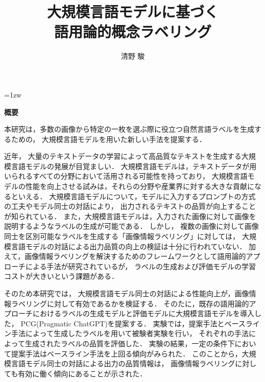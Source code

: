 \documentclass[a4paper,11pt]{jreport}
\title{大規模言語モデルに基づく\\語用論的概念ラベリング}
\author{清野 駿}
\begin{document}
\maketitle
\thispagestyle{empty}
\newpage

\thispagestyle{empty}
\vspace*{20pt plus 1fil}
\parindent=1zw
\noindent
\begin{center}
{\bf 概要}
\vspace{5mm}
\end{center}
本研究は，多数の画像から特定の一枚を選ぶ際に役立つ自然言語ラベルを生成するための，
大規模言語モデルを用いた新しい手法を提案する．

近年，
大量のテキストデータの学習によって高品質なテキストを生成する大規模言語モデルの発展が目覚ましい．
大規模言語モデルは，テキストデータが用いられるすべての分野において活用される可能性を持っており，
大規模言語モデルの性能を向上させる試みは，それらの分野や産業界に対する大きな貢献になるといえる．
大規模言語モデルについて，モデルに入力するプロンプトの方式の工夫やモデル同士の対話により，
出力されるテキストの品質が向上することが知られている．
また，大規模言語モデルは，入力された画像に対して画像を説明するようなラベルの生成が可能である．
しかし，
複数の画像に対して画像同士を区別可能なラベルを生成する「画像情報ラベリング」に対しては，
大規模言語モデルの対話による出力品質の向上の検証は十分に行われていない．
加えて，画像情報ラベリングを解決するためのフレームワークとして語用論的アプローチによる手法が研究されているが，
ラベルの生成および評価モデルの学習コストが大きいという課題がある．

そのため本研究では，
大規模言語モデル同士の対話による性能向上が，画像情報ラベリングに対して有効であるかを検証する．
そのたに，既存の語用論的アプローチにおけるラベルの生成モデルと評価モデルに大規模言語モデルを導入した，
PCG(Pragmatic ChatGPT)を提案する．
実験では，提案手法とベースライン手法によって生成したラベルを用いて被験者実験を行い，
それぞれの手法によって生成されたラベルの品質を評価した．
実験の結果，一定の条件下において提案手法はベースライン手法を上回る傾向がみられた．
このことから，大規模言語モデル同士の対話による出力の品質情報は，
画像情報ラベリングに対しても有効に働く傾向にあることが示された．

\par
\vspace{0pt plus 1fil}
\newpage

\tableofcontents
\listoffigures
\end{document}
